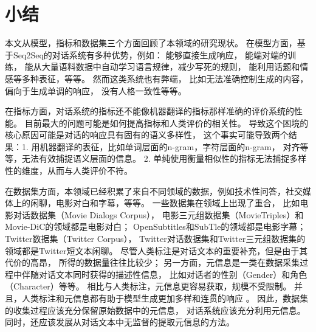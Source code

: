 \section{小结}\label{sec:rw_conclusion}
本文从模型，指标和数据集三个方面回顾了本领域的研究现状。
在模型方面，基于Seq2Seq的对话系统有多种优势，例如：
能够直接生成响应，
能端对端的训练，
能从大量语料数据中自动学习语言规律，减少写死的规则，
能利用话题和情感等多种表征，等等。
然而这类系统也有弊端，
比如无法准确控制生成的内容，
偏向于生成单调的响应，
没有人格一致性等等。

在指标方面，对话系统的指标还不能像机器翻译的指标那样准确的评价系统的性能。
目前最大的问题可能是如何提高指标和人类评价的相关性。
导致这个困境的核心原因可能是对话的响应具有固有的语义多样性，
这个事实可能导致两个结果：1. 用机器翻译的表征，比如单词层面的n-gram，字符层面的n-gram，
对齐等等，无法有效捕捉语义层面的信息。
2. 单纯使用衡量相似性的指标无法捕捉多样性的维度，从而与人类评价不符。

在数据集方面，本领域已经积累了来自不同领域的数据，例如技术性问答，社交媒体上的闲聊，电影对白和字幕，等等。
一些数据集在领域上出现了重合，
比如电影对话数据集（Movie Dialogs Corpus），
电影三元组数据集（MovieTriples）和Movie-DiC的领域都是电影对白；
OpenSubtitles和SubTle的领域都是电影字幕；
Twitter数据集（Twitter Corpus），
Twitter对话数据集和Twitter三元组数据集的领域都是Twitter短文本闲聊。
尽管人类标注是对话文本的重要补充，但是由于其代价的高昂，
所得的数据量往往比较少；
另一方面，元信息是一类在数据采集过程中伴随对话文本同时获得的描述性信息，
比如对话者的性别（Gender）和角色（Character）等等。
相比与人类标注，元信息更容易获取，规模不受限制。
并且，人类标注和元信息都有助于模型生成更加多样和连贯的响应
。
因此，数据集的收集过程应该充分保留原始数据中的元信息，
对话系统应该充分利用元信息。
同时，还应该发展从对话文本中无监督的提取元信息的方法。
